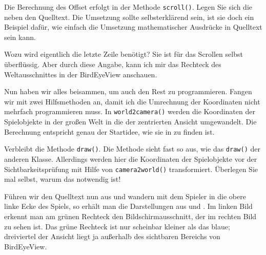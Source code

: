 
Die Berechnung des Offset erfolgt in der Methode \texttt{scroll()}. Legen Sie sich die  neben den Quelltext. Die Umsetzung sollte selbsterklärend sein, ist sie doch ein Beispiel dafür, wie einfach die Umsetzung mathematischer Ausdrücke in Quelltext sein kann. 

Wozu wird eigentlich die letzte Zeile benötigt? Sie ist für das Scrollen selbst überflüssig. Aber durch diese Angabe, kann ich mir das Rechteck des Weltausschnittes in der BirdEyeView anschauen. 


Nun haben wir alles beisammen, um auch den Rest zu programmieren. Fangen wir mit zwei Hilfsmethoden an, damit ich die Umrechnung der Koordinaten nicht mehrfach programmieren muss. In \texttt{world2camera()} werden die Koordinaten der Spielobjekte in der großen Welt in die der zentrierten Ansicht umgewandelt. Die Berechnung entspricht genau der Startidee, wie sie in  zu finden ist. 


Verbleibt die Methode \texttt{draw()}. Die Methode sieht fast so aus, wie das \texttt{draw()} der anderen Klasse. Allerdings werden hier die Koordinaten der Spielobjekte vor der Sichtbarkeitsprüfung mit Hilfe von \texttt{camera2world()} transformiert. Überlegen Sie mal selbst, warum das notwendig ist!


Führen wir den Quelltext nun aus und wandern mit dem Spieler in die obere linke Ecke des Spiels, so erhält man die Darstellungen aus  und . Im linken Bild erkennt man am grünen Rechteck den Bildschirmausschnitt, der im rechten Bild zu sehen ist. Das grüne Rechteck ist nur scheinbar kleiner als das blaue; dreiviertel der Ansicht liegt ja außerhalb des sichtbaren Bereichs von BirdEyeView.

